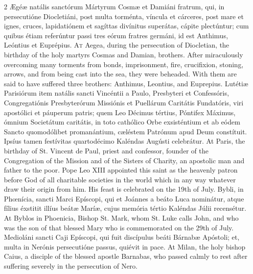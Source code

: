\begin{paracol}{2}
Ægéæ natális sanctórum 
 Mártyrum Cosmæ et Damiáni fratrum, qui, in persecutióne Diocletiáni, post 
 multa torménta, víncula et cárceres, post mare et ignes, cruces, 
 lapidatiónem et sagíttas divínitus superátas, cápite plectúntur; cum quibus 
 étiam referúntur passi tres eórum fratres germáni, id est Anthimus, Leóntius 
 et Euprépius.
\switchcolumn
{}
\lettrine[lines=2]{A}{t} Aegea, during the persecution of 
 Diocletian, the birthday of the holy martyrs Cosmas and Damian, brothers. 
 After miraculously overcoming many torments from bonds, imprisonment, fire, 
 crucifixion, stoning, arrows, and from being cast into the sea, they were 
 beheaded. With them are said to have suffered three brothers: Anthimus, 
 Leontius, and Euprepius.
\switchcolumn*
{}
Lutétiæ Parisiórum item 
 natális sancti Vincéntii a Paulo, Presbyteri et Confessóris, Congregatiónis 
 Presbyterórum Missiónis et Puellárum Caritátis Fundatóris, viri apostólici 
 et páuperum patris; quem Leo Décimus tértius, Póntifex Máximus, ómnium 
 Societátum caritátis, in toto cathólico Orbe exsisténtium et ab eódem Sancto 
 quomodólibet promanántium, cæléstem Patrónum apud Deum constítuit. 
 Ipsíus tamen festívitas quartodécimo Kaléndas Augústi celebrátur.
\switchcolumn
{}
At Paris, the birthday of St. 
 Vincent de Paul, priest and confessor, founder of the Congregation of the 
 Mission and of the Sisters of Charity, an apostolic man and father to the 
 poor. Pope Leo XIII appointed this saint as the heavenly patron before 
 God of all charitable societies in the world which in any way whatever draw 
 their origin from him. His feast is celebrated on the 19th of July.
\switchcolumn*
{}
Bybli, in Phœnícia, 
 sancti Marci Epíscopi, qui et Joánnes a beáto Luca nominátur, atque fílius éxstitit illíus beátæ Maríæ, cujus memória tértio Kaléndas Júlii recensétur.
\switchcolumn
{}
At Byblos in Phoenicia, Bishop St. 
 Mark, whom St. Luke calls John, and who was the son of that blessed Mary who 
 is commemorated on the 29th of July.
\switchcolumn*
{}
Medioláni sancti Caji 
 Epíscopi, qui fuit discípulus beáti Bárnabæ Apóstoli; et, multa in Nerónis 
 persecutióne passus, quiévit in pace.
\switchcolumn
{}
At Milan, the holy bishop Caius, a 
 disciple of the blessed apostle Barnabas, who passed calmly to rest after 
 suffering severely in the persecution of Nero.
\switchcolumn*
{}

\end{paracol}
